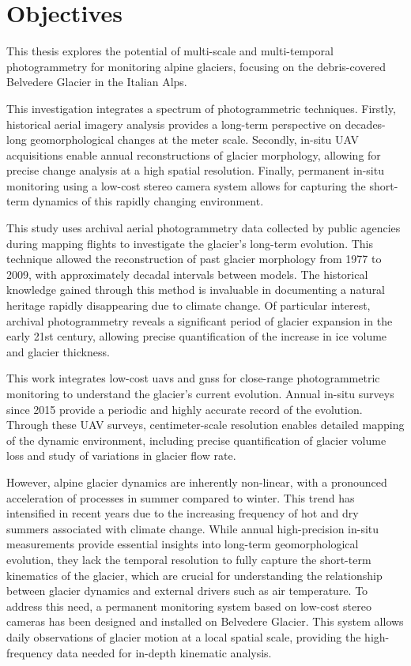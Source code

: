 \section{Objectives}

This thesis explores the potential of multi-scale and multi-temporal photogrammetry for monitoring alpine glaciers, focusing on the debris-covered Belvedere Glacier in the Italian Alps.

This investigation integrates a spectrum of photogrammetric techniques.  
Firstly, historical aerial imagery analysis provides a long-term perspective on decades-long geomorphological changes at the meter scale.  
Secondly, in-situ UAV acquisitions enable annual reconstructions of glacier morphology, allowing for precise change analysis at a high spatial resolution.  
Finally, permanent in-situ monitoring using a low-cost stereo camera system allows for capturing the short-term dynamics of this rapidly changing environment.


This study uses archival aerial photogrammetry data collected by public agencies during mapping flights to investigate the glacier's long-term evolution.
This technique allowed the reconstruction of past glacier morphology from 1977 to 2009, with approximately decadal intervals between models.  
The historical knowledge gained through this method is invaluable in documenting a natural heritage rapidly disappearing due to climate change. 
Of particular interest, archival photogrammetry reveals a significant period of glacier expansion in the early 21st century, allowing precise quantification of the increase in ice volume and glacier thickness.

This work integrates low-cost \acp{uav} and \acs{gnss} for close-range photogrammetric monitoring to understand the glacier's current evolution.
Annual in-situ surveys since 2015 provide a periodic and highly accurate record of the evolution. 
Through these UAV surveys, centimeter-scale resolution enables detailed mapping of the dynamic environment, including precise quantification of glacier volume loss and study of variations in glacier flow rate.

However, alpine glacier dynamics are inherently non-linear, with a pronounced acceleration of processes in summer compared to winter.  
This trend has intensified in recent years due to the increasing frequency of hot and dry summers associated with climate change. 
While annual high-precision in-situ measurements provide essential insights into long-term geomorphological evolution, they lack the temporal resolution to fully capture the short-term kinematics of the glacier, which are crucial for understanding the relationship between glacier dynamics and external drivers such as air temperature.
To address this need, a permanent monitoring system based on low-cost stereo cameras has been designed and installed on Belvedere Glacier. 
This system allows daily observations of glacier motion at a local spatial scale,
providing the high-frequency data needed for in-depth kinematic analysis.

